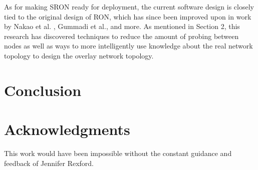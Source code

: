 \documentclass[pageno]{jpaper}
\begin{document}
As for making SRON ready for deployment, the current software design is closely tied to the original design of 
RON, which has since been improved upon in work by Nakao et al. \cite{Nakao:2006:SRO:1113361.1113372}, Gummadi et al.\cite{Gummadi:2004:IRI:1251254.1251267}, and more.  As mentioned in Section 2, this research has discovered techniques to reduce the amount of probing between nodes as well as ways to more intelligently use knowledge about the real network topology to design the overlay network topology.

\section{Conclusion}

\section{Acknowledgments}
This work would have been impossible without the constant guidance and feedback of Jennifer Rexford.




\end{document}

